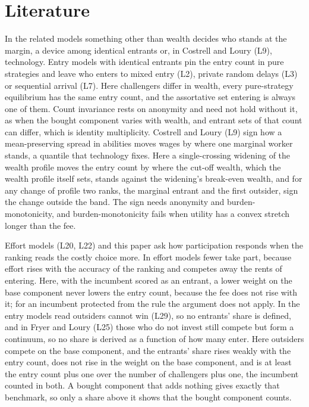 \section{Literature}
\label{sec:literature}

In the related models something other than wealth decides who stands at the
margin, a device among identical entrants or, in Costrell and Loury (L9),
technology. Entry models with identical entrants pin the entry count in pure
strategies and leave who enters to mixed entry (L2), private random delays (L3)
or sequential arrival (L7). Here challengers differ in wealth, every
pure-strategy equilibrium has the same entry count, and the assortative set
entering is always one of them. Count invariance rests on anonymity and need not
hold without it, as when the bought component varies with wealth, and entrant
sets of that count can differ, which is identity multiplicity. Costrell and
Loury (L9) sign how a mean-preserving spread in abilities moves wages by where
one marginal worker stands, a quantile that technology fixes. Here a
single-crossing widening of the wealth profile moves the entry count by where
the cut-off wealth, which the wealth profile itself sets, stands against the
widening's break-even wealth, and for any change of profile two ranks, the
marginal entrant and the first outsider, sign the change outside the band. The
sign needs anonymity and burden-monotonicity, and burden-monotonicity fails when
utility has a convex stretch longer than the fee.

Effort models (L20, L22) and this paper ask how participation responds when the
ranking reads the costly choice more. In effort models fewer take part, because
effort rises with the accuracy of the ranking and competes away the rents of
entering. Here, with the incumbent scored as an entrant, a lower weight on the
base component never lowers the entry count, because the fee does not rise with
it; for an incumbent protected from the rule the argument does not apply. In the
entry models read outsiders cannot win (L29), so no entrants' share is defined,
and in Fryer and Loury (L25) those who do not invest still compete but form a
continuum, so no share is derived as a function of how many enter. Here
outsiders compete on the base component, and the entrants' share rises weakly
with the entry count, does not rise in the weight on the base component, and is
at least the entry count plus one over the number of challengers plus one, the
incumbent counted in both. A bought component that adds nothing gives exactly
that benchmark, so only a share above it shows that the bought component counts.

